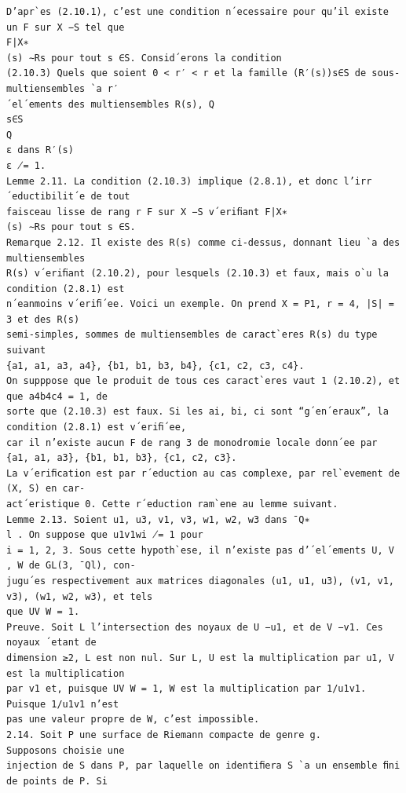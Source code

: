 \documentclass[11pt]{article}
\begin{document}
\begin{Verbatim}[breaklines=true,fontsize=\small]
D’apr`es (2.10.1), c’est une condition n´ecessaire pour qu’il existe un F sur X −S tel que
F|X∗
(s) ∼Rs pour tout s ∈S. Consid´erons la condition
(2.10.3) Quels que soient 0 < r′ < r et la famille (R′(s))s∈S de sous-multiensembles `a r′
´el´ements des multiensembles R(s), Q
s∈S
Q
ε dans R′(s)
ε ̸= 1.
Lemme 2.11. La condition (2.10.3) implique (2.8.1), et donc l’irr´eductibilit´e de tout
faisceau lisse de rang r F sur X −S v´eriﬁant F|X∗
(s) ∼Rs pour tout s ∈S.
Remarque 2.12. Il existe des R(s) comme ci-dessus, donnant lieu `a des multiensembles
R(s) v´eriﬁant (2.10.2), pour lesquels (2.10.3) et faux, mais o`u la condition (2.8.1) est
n´eanmoins v´eriﬁ´ee. Voici un exemple. On prend X = P1, r = 4, |S| = 3 et des R(s)
semi-simples, sommes de multiensembles de caract`eres R(s) du type suivant
{a1, a1, a3, a4}, {b1, b1, b3, b4}, {c1, c2, c3, c4}.
On supppose que le produit de tous ces caract`eres vaut 1 (2.10.2), et que a4b4c4 = 1, de
sorte que (2.10.3) est faux. Si les ai, bi, ci sont “g´en´eraux”, la condition (2.8.1) est v´eriﬁ´ee,
car il n’existe aucun F de rang 3 de monodromie locale donn´ee par
{a1, a1, a3}, {b1, b1, b3}, {c1, c2, c3}.
La v´eriﬁcation est par r´eduction au cas complexe, par rel`evement de (X, S) en car-
act´eristique 0. Cette r´eduction ram`ene au lemme suivant.
Lemme 2.13. Soient u1, u3, v1, v3, w1, w2, w3 dans ¯Q∗
l . On suppose que u1v1wi ̸= 1 pour
i = 1, 2, 3. Sous cette hypoth`ese, il n’existe pas d’´el´ements U, V , W de GL(3, ¯Ql), con-
jugu´es respectivement aux matrices diagonales (u1, u1, u3), (v1, v1, v3), (w1, w2, w3), et tels
que UV W = 1.
Preuve. Soit L l’intersection des noyaux de U −u1, et de V −v1. Ces noyaux ´etant de
dimension ≥2, L est non nul. Sur L, U est la multiplication par u1, V est la multiplication
par v1 et, puisque UV W = 1, W est la multiplication par 1/u1v1. Puisque 1/u1v1 n’est
pas une valeur propre de W, c’est impossible.
2.14. Soit P une surface de Riemann compacte de genre g.
Supposons choisie une
injection de S dans P, par laquelle on identiﬁera S `a un ensemble ﬁni de points de P. Si


\end{Verbatim}
\end{document}
